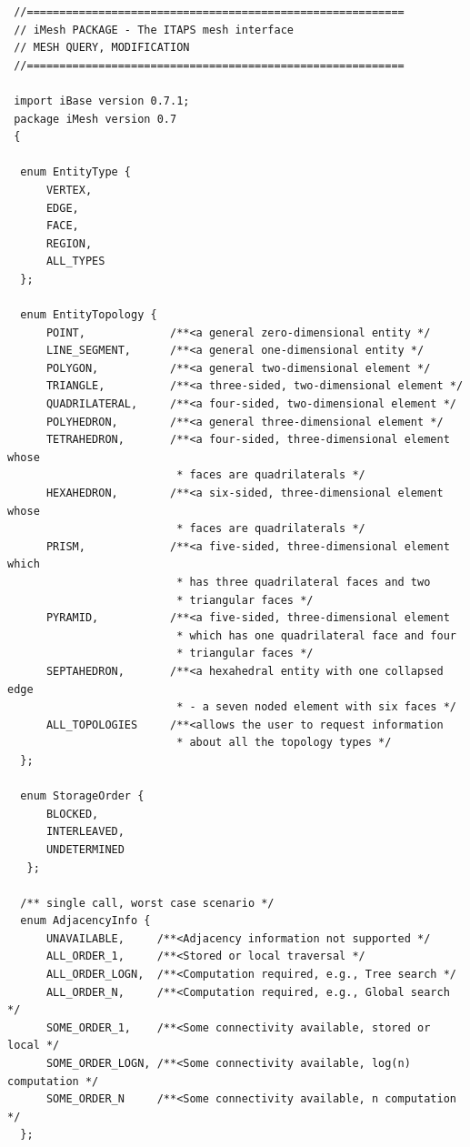 \documentclass{article}
\begin{document}
\begin{small}
\begin{verbatim}
 //==========================================================
 // iMesh PACKAGE - The ITAPS mesh interface
 // MESH QUERY, MODIFICATION
 //==========================================================

 import iBase version 0.7.1;
 package iMesh version 0.7
 {

  enum EntityType {  
      VERTEX,  
      EDGE,  
      FACE,  
      REGION, 
      ALL_TYPES 
  };

  enum EntityTopology { 
      POINT,             /**<a general zero-dimensional entity */ 
      LINE_SEGMENT,      /**<a general one-dimensional entity */ 
      POLYGON,           /**<a general two-dimensional element */ 
      TRIANGLE,          /**<a three-sided, two-dimensional element */ 
      QUADRILATERAL,     /**<a four-sided, two-dimensional element */ 
      POLYHEDRON,        /**<a general three-dimensional element */ 
      TETRAHEDRON,       /**<a four-sided, three-dimensional element whose  
                          * faces are quadrilaterals */ 
      HEXAHEDRON,        /**<a six-sided, three-dimensional element whose  
                          * faces are quadrilaterals */ 
      PRISM,             /**<a five-sided, three-dimensional element which 
                          * has three quadrilateral faces and two 
                          * triangular faces */ 
      PYRAMID,           /**<a five-sided, three-dimensional element  
                          * which has one quadrilateral face and four 
                          * triangular faces */ 
      SEPTAHEDRON,       /**<a hexahedral entity with one collapsed edge  
                          * - a seven noded element with six faces */ 
      ALL_TOPOLOGIES     /**<allows the user to request information 
                          * about all the topology types */ 
  };

  enum StorageOrder { 
      BLOCKED, 
      INTERLEAVED, 
      UNDETERMINED 
   };

  /** single call, worst case scenario */ 
  enum AdjacencyInfo {  
      UNAVAILABLE,     /**<Adjacency information not supported */ 
      ALL_ORDER_1,     /**<Stored or local traversal */ 
      ALL_ORDER_LOGN,  /**<Computation required, e.g., Tree search */  
      ALL_ORDER_N,     /**<Computation required, e.g., Global search */ 
      SOME_ORDER_1,    /**<Some connectivity available, stored or local */ 
      SOME_ORDER_LOGN, /**<Some connectivity available, log(n) computation */ 
      SOME_ORDER_N     /**<Some connectivity available, n computation */ 
  };


\end{verbatim}
\end{small}
\end{document}
